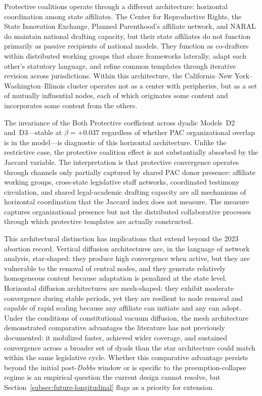 Protective coalitions operate through a different architecture: horizontal coordination among state affiliates. The Center for Reproductive Rights, the State Innovation Exchange, Planned Parenthood's affiliate network, and NARAL do maintain national drafting capacity, but their state affiliates do not function primarily as passive recipients of national models. They function as co-drafters within distributed working groups that share frameworks laterally, adapt each other's statutory language, and refine common templates through iterative revision across jurisdictions. Within this architecture, the California–New York–Washington–Illinois cluster operates not as a center with peripheries, but as a set of mutually influential nodes, each of which originates some content and incorporates some content from the others.

The invariance of the Both Protective coefficient across dyadic Models~D2 and~D3---stable at $\beta = +0.037$ regardless of whether PAC organizational overlap is in the model---is diagnostic of this horizontal architecture. Unlike the restrictive case, the protective coalition effect is not substantially absorbed by the Jaccard variable. The interpretation is that protective convergence operates through channels only partially captured by shared PAC donor presence: affiliate working groups, cross-state legislative staff networks, coordinated testimony circulation, and shared legal-academic drafting capacity are all mechanisms of horizontal coordination that the Jaccard index does not measure. The measure captures organizational presence but not the distributed collaborative processes through which protective templates are actually constructed.

This architectural distinction has implications that extend beyond the 2023 abortion record. Vertical diffusion architectures are, in the language of network analysis, star-shaped: they produce high convergence when active, but they are vulnerable to the removal of central nodes, and they generate relatively homogeneous content because adaptation is penalized at the state level. Horizontal diffusion architectures are mesh-shaped: they exhibit moderate convergence during stable periods, yet they are resilient to node removal and capable of rapid scaling because any affiliate can initiate and any can adopt. Under the conditions of constitutional vacuum diffusion, the mesh architecture demonstrated comparative advantages the literature has not previously documented: it mobilized faster, achieved wider coverage, and sustained convergence across a broader set of dyads than the star architecture could match within the same legislative cycle. Whether this comparative advantage persists beyond the initial post-\textit{Dobbs} window or is specific to the preemption-collapse regime is an empirical question the current design cannot resolve, but Section~\ref{subsec:future-longitudinal} flags as a priority for extension.

